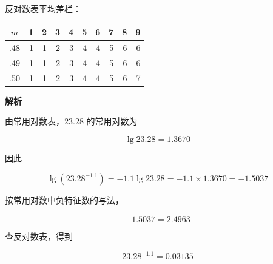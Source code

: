 \begin{answer}
\normalsize

反对数表平均差栏：

\scriptsize

\begin{center}
\begingroup\setlength{\tabcolsep}{4pt}
\begin{tabular}{crrrrrrrrr}
\toprule
$m$ & 1 & 2 & 3 & 4 & 5 & 6 & 7 & 8 & 9 \\
\midrule
.48 & 1 & 1 & 2 & 3 & 4 & 4 & 5 & 6 & 6 \\
.49 & 1 & 1 & 2 & 3 & 4 & 4 & 5 & 6 & 6 \\
.50 & 1 & 1 & 2 & 3 & 4 & 4 & 5 & 6 & 7 \\
\bottomrule
\end{tabular}
\endgroup
\end{center}

\normalsize

\textbf{解析}

由常用对数表，$23.28$ 的常用对数为

\nopagebreak[4]
\[
\lg23.28=1.3670
\]

因此

\nopagebreak[4]
\[
\lg(23.28^{-1.1})=-1.1\lg23.28
=-1.1\times1.3670=-1.5037
\]

按常用对数中负特征数的写法，

\nopagebreak[4]
\[
-1.5037=\overline{2}.4963
\]

查反对数表，得到

\nopagebreak[4]
\[
23.28^{-1.1}=0.03135
\]


\end{answer}

